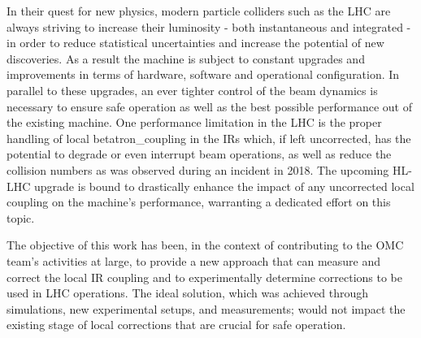 
In their quest for new physics, modern particle colliders such as the \gls{LHC} are always striving to increase their \gls{luminosity} - both instantaneous and integrated - in order to reduce statistical uncertainties and increase the potential of new discoveries.
As a result the machine is subject to constant upgrades and improvements in terms of hardware, software and operational configuration.
In parallel to these upgrades, an ever tighter control of the \gls{beam} dynamics is necessary to ensure safe operation as well as the best possible performance out of the existing machine.
One performance limitation in the \gls{LHC} is the proper handling of local \gls{betatron_coupling} in the \glspl{IR} which, if left uncorrected, has the potential to degrade or even interrupt beam operations, as well as reduce the collision numbers as was observed during an incident in \num{2018}.
The upcoming \gls{HL-LHC} upgrade is bound to drastically enhance the impact of any uncorrected local coupling on the machine's performance, warranting a dedicated effort on this topic.

The objective of this work has been, in the context of contributing to the \gls{OMC} team's activities at large, to provide a new approach that can measure and correct the local \gls{IR} coupling and to experimentally determine corrections to be used in LHC operations.
The ideal solution, which was achieved through simulations, new experimental setups, and measurements; would not impact the existing stage of local corrections that are crucial for safe operation.

